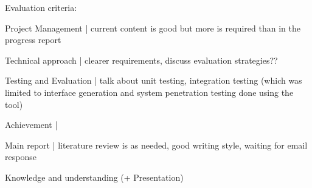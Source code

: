 
Evaluation criteria:
\begin{list}{-}{ }
	\item Project Management | current content is good but more is required than in the progress report
	\item Technical approach | clearer requirements, discuss evaluation strategies??
	\item Testing and Evaluation | talk about unit testing, integration testing (which was limited to interface generation and system penetration testing done using the tool) 
	\item Achievement | 
	\item Main report | literature review is as needed, good writing style, waiting for email response
	\item Knowledge and understanding (+ Presentation)
\end{list}


